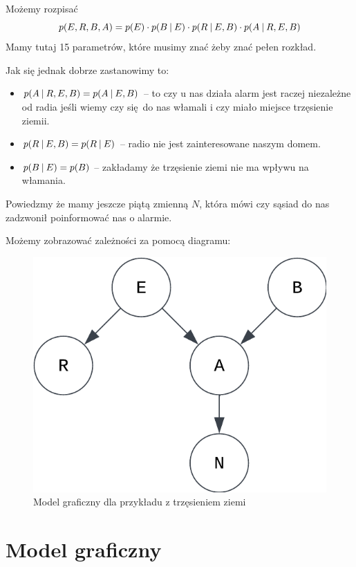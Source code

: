 Możemy rozpisać
\[
	p(E, R, B, A) = p(E) \cdot p(B \:\vert\: E) \cdot p(R \:\vert\: E, B) \cdot p(A \:\vert\: R, E, B)
\]
Mamy tutaj 15 parametrów, które musimy znać żeby znać pełen rozkład.

Jak się jednak dobrze zastanowimy to:
\begin{itemize}
	\item \( p(A \:\vert\: R, E, B) = p(A \:\vert\: E, B) \) -- to czy u nas działa alarm jest raczej niezależne od radia jeśli wiemy czy się do nas włamali i czy miało miejsce trzęsienie ziemii.

	\item \( p(R \:\vert\: E, B) = p(R \:\vert\: E) \) -- radio nie jest zainteresowane naszym domem.

	\item \( p(B \:\vert\: E) = p(B) \) -- zakładamy że trzęsienie ziemi nie ma wpływu na włamania.
\end{itemize}

Powiedzmy że mamy jeszcze piątą zmienną \( N \), która mówi czy sąsiad do nas zadzwonił poinformować nas o alarmie.

Możemy zobrazować zależności za pomocą diagramu:

\begin{figure}[H]
	\centering
	\includegraphics{chapters/graphical models/img/example.png}
	\caption{Model graficzny dla przykładu z trzęsieniem ziemi}
\end{figure}

\section{Model graficzny}

